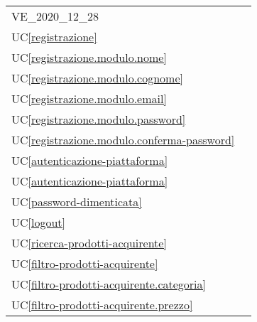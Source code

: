 \begin{longtable}{C{6cm} C{6cm}}
	VE\_2020\_12\_28 &  \newline {}  \\

	UC\ref{registrazione} &  \\

	UC\ref{registrazione.modulo.nome} &  \\

    UC\ref{registrazione.modulo.cognome} &  \\

	UC\ref{registrazione.modulo.email} &  \\

    UC\ref{registrazione.modulo.password} &  \\

	UC\ref{registrazione.modulo.conferma-password} &  \\

    UC\ref{autenticazione-piattaforma} &  \\

	UC\ref{autenticazione-piattaforma} &  \\

    UC\ref{password-dimenticata} &  \\

	UC\ref{logout} &  \\

    UC\ref{ricerca-prodotti-acquirente} &  \\

	UC\ref{filtro-prodotti-acquirente} &  \\

    UC\ref{filtro-prodotti-acquirente.categoria} &  \\

	UC\ref{filtro-prodotti-acquirente.prezzo} &  \\


\end{longtable}
